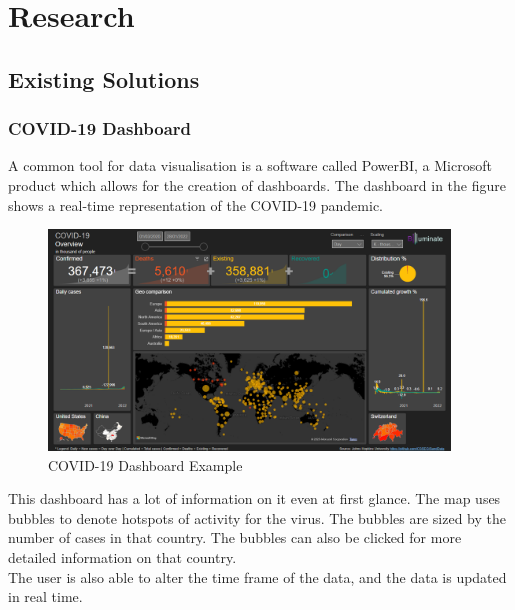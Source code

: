 \documentclass{report}
\begin{document}
\newpage

\newpage

\chapter{Research}
\section{Existing Solutions}
\subsection{COVID-19 Dashboard}
A common tool for data visualisation is a software called PowerBI, a Microsoft product which allows for the creation of dashboards. 
The dashboard in the figure shows a real-time representation of the COVID-19 pandemic.
\begin{center}
    \begin{figure}[h]
        \centering
        \includegraphics[width=0.95\textwidth]{PowerBI Example.png}
        \caption{COVID-19 Dashboard Example}
        \label{fig:covid19_dashboard}
    \end{figure}
\end{center}

This dashboard has a lot of information on it even at first glance. The map uses bubbles to denote hotspots of activity for the virus. The bubbles are sized by the number of cases in that country. The bubbles can also be clicked for more detailed information on that country. \\
The user is also able to alter the time frame of the data, and the data is updated in real time.\\
\newpage
\end{document}
